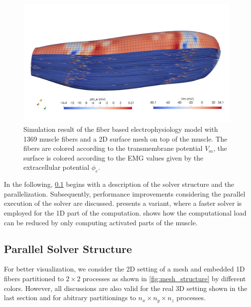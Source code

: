 \begin{figure}
  \centering%
  \includegraphics[width=\textwidth]{images/results/application/fibers_3.png}
  \caption{Simulation result of the fiber based electrophysiology model with 1369 muscle fibers and a 2D surface mesh on top of the muscle. The fibers are colored according to the transmembrane potential $V_m$, the surface is colored according to the EMG values given by the extracellular potential $\phi_e$.}%
  \label{fig:solver_fibers_3}%
\end{figure}

In the following, \cref{sec:parallel_partitioning_for_fiber_based_solver} begins with a description of the solver structure and the parallelization. Subsequently, performance improvements considering the parallel execution of the solver are discussed.  presents a variant, where a faster solver is employed for the 1D part of the computation.  shows how the computational load can be reduced by only computing activated parts of the muscle.

\subsection{Parallel Solver Structure}\label{sec:parallel_partitioning_for_fiber_based_solver}
For better visualization, we consider the 2D setting of a mesh and embedded 1D fibers partitioned to $2\times 2$ processes as shown in \cref{fig:mesh_structure} by different colors. However, all discussions are also valid for the real 3D setting shown in the last section and for abitrary partitionings to $n_x \times n_y \times n_z$ processes.

